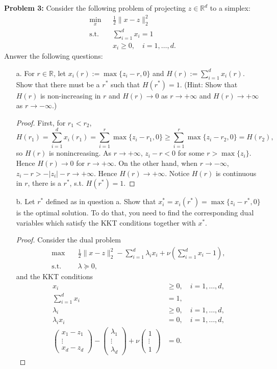 \documentclass{article}
\begin{document}
\noindent\textbf{Problem 3:} Consider the following problem of projecting $z\in\mathbb{R}^d$ to a simplex:
\begin{eqnarray*}
	\min_{x}&& \frac{1}{2}\|x-z\|_2^2\\
	\text{s.t.}&& \sum_{i=1}^dx_i=1\\
	&& x_i\geq 0, \quad i=1,\dots,d.
\end{eqnarray*}
Answer the following questions:
\begin{enumerate}
\item[a.] For $r\in\mathbb{R}$, let $x_i(r):=\max\{z_i-r,0\}$ and $H(r):=\sum_{i=1}^d x_i(r)$. Show that there must be a $r^*$ such that $H(r^*)=1$. (Hint: Show that $H(r)$ is non-increasing in $r$ and $H(r)\rightarrow 0$ as $r\rightarrow+\infty$ and $H(r)\rightarrow +\infty$ as $r\rightarrow-\infty$.)

\begin{proof}
First, for $r_1 < r_2 $, 
$$
H(r_1) = \sum_{i=1}^{d}x_i(r_1) = \sum_{i=1}^{r}\max\{z_i-r_1, 0\} \ge \sum_{i=1}^{r}\max\{z_i-r_2, 0\} = H(r_2),
$$
so $H(r)$ is nonincreasing. As $r\to+\infty$, $z_i - r < 0$ for some $r > \max\{z_i\}$. Hence $H(r)\to 0$ for $r\to+\infty$. On the other hand, when $r\to-\infty$, $z_i-r > -|z_i|-r\to+\infty $. Hence $H(r)\to+\infty$. Notice $H(r)$ is continuous in $r$, there is a $r^* $, s.t. $H(r^*) = 1$.

\end{proof}

\item[b.] Let $r^*$ defined as in question a. Show that $x_i^*=x_i(r^*)=\max\{z_i-r^*,0\}$ is the optimal solution. To do that, you need to find the corresponding dual variables which satisfy the KKT conditions together with $x^*$.

\begin{proof}
Consider the dual problem
$$
\begin{aligned}
\max\quad &\frac{1}{2}\lVert x-z\rVert_2^2 - \sum_{i=1}^{d}\lambda_ix_i + \nu (\sum_{i=1}^{d}x_i - 1), \\
\text{s.t.}\quad &\lambda \succeq 0,
\end{aligned}
$$
and the KKT conditions
$$
\begin{aligned}
x_i &\ge 0, \quad i = 1,\hdots, d, \\
\sum_{i=1}^{d}x_i &= 1, \\
\lambda_i &\ge 0, \quad i = 1,\hdots, d, \\
\lambda_ix_i &= 0, \quad i = 1,\hdots, d, \\
\begin{pmatrix}
x_1-z_1 \\ \vdots \\ x_d-z_d
\end{pmatrix}
-
\begin{pmatrix}
\lambda_1 \\ \vdots \\ \lambda_d
\end{pmatrix}
+\nu
\begin{pmatrix}
1 \\ \vdots \\ 1
\end{pmatrix}
&= 0.
\end{aligned}
$$


\end{proof}
\end{enumerate}
\end{document}
